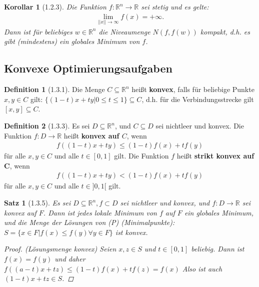 \documentclass[ngerman,halfparskip]{scrartcl}
\newtheorem*{satz}{Satz}
\newtheorem*{korollar}{Korollar}
\theoremstyle{definition}
\newtheorem*{defin}{Definition}
\def\R{\mathbb R}
\begin{document}
\begin{korollar}[1.2.3]
Die Funktion $f:\R^n\rightarrow\R$ sei stetig und es gelte:
\begin{gather*}\tag{1.2.1}
\lim\limits_{||x||\rightarrow \infty}f(x)=+\infty.
\end{gather*}
Dann ist für beliebiges $w\in\R^n$ die Niveaumenge $N(f,f(w))$ kompakt, d.h. es gibt (mindestens) ein globales Minimum von $f$.
\end{korollar}


\subsection*{Konvexe Optimierungsaufgaben}
\begin{defin}[1.3.1] Die Menge $C\subseteq \R^n$ heißt \textbf{konvex}, falls für beliebige Punkte $x,y\in C$ gilt: $\{ (1-t)x+ty|0\leq t\leq 1\}\subseteq C$, d.h. für die Verbindungsstrecke gilt $[x,y]\subseteq C$.
\end{defin}

\begin{defin}[1.3.3] Es sei $D\subseteq \R^n$, und $C\subseteq D$ sei nichtleer und konvex. Die Funktion $f:D\rightarrow \R$ heißt \textbf{konvex auf $C$}, wenn 
\begin{gather*}
f((1-t)x+ty)\leq (1-t)f(x)+tf(y)
\end{gather*}
für alle $x,y\in C$ und alle $t\in[0,1]$ gilt. Die Funktion $f$ heißt \textbf{strikt konvex auf C}, wenn 
\begin{gather*}
f((1-t)x+ty)< (1-t)f(x)+tf(y)
\end{gather*}
für alle $x,y\in C$ und alle $t\in]0,1[$ gilt.
\end{defin}

\begin{satz}[1.3.5]
Es sei $D\subseteq \R^n, f\subset D$ sei nichtleer und konvex, und $f:D\rightarrow \R$ sei konvex auf $F$. Dann ist jedes lokale Minimum von $f$ auf $F$ ein globales Minimum, und die Menge der Lösungen von (P) (Minimalpunkte): $S=\{x\in F| f(x)\leq f(y) \forall y\in F\}$ ist konvex.
\begin{proof}
(Lösungsmenge konvex) Seien $x,z\in S$ und $t\in[0,1]$ beliebig. Dann ist $f(x)=f(y)$ und daher $f((a-t)x+tz)\leq (1-t)f(x)+tf(z)=f(x)$ Also ist auch $(1-t)x+tz\in S$.
\end{proof}
\end{satz}
\end{document}
